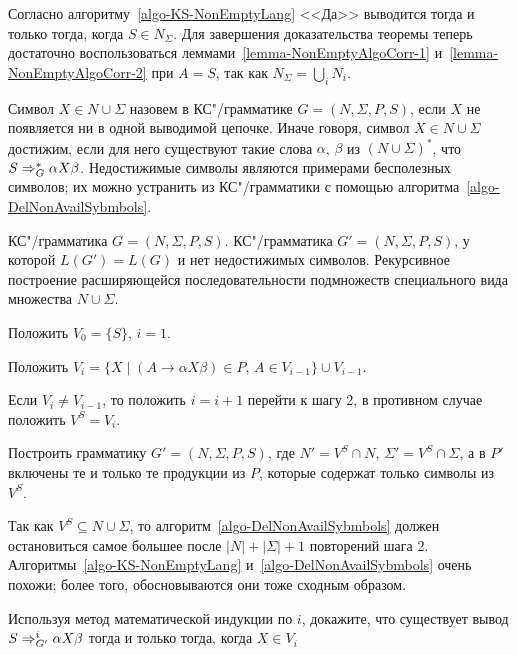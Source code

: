 \begin{myproof}
Согласно алгоритму~\ref{algo-KS-NonEmptyLang} <<Да>> выводится тогда и только тогда, когда $S\in N_\Sigma$. Для завершения доказательства теоремы теперь достаточно воспользоваться леммами~\ref{lemma-NonEmptyAlgoCorr-1} и~\ref{lemma-NonEmptyAlgoCorr-2} при $A=S$, так как $N_\Sigma=\bigcup_iN_i$.
\end{myproof}

Символ $X\in N\cup\Sigma$ назовем  в КС"/грамматике $G=(N,\Sigma,P,S)$, если $X$ не появляется ни в одной выводимой цепочке. Иначе говоря, символ $X\in N\cup\Sigma$ достижим, если для него существуют такие слова $\alpha$, $\beta$ из $(N\cup\Sigma)^*$, что $S\Rightarrow_G^*\alpha X\beta$. Недостижимые символы являются примерами бесполезных символов; их можно устранить из КС"/грамматики с помощью алгоритма~\ref{algo-DelNonAvailSybmbols}.

{\label{algo-DelNonAvailSybmbols}КС"/грамматика $G=(N,\Sigma,P,S)$.}
{КС"/грамматика $G'=(N,\Sigma,P,S)$, у которой $L(G')=L(G)$ и нет недостижимых символов.}
{Рекурсивное построение расширяющейся последовательности подмножеств специального вида множества $N\cup\Sigma$.}
{
\item Положить $V_0=\{S\}$, $i=1$.

\item  Положить $V_i=\{X\mid (A\to\alpha X\beta)\in P$, $A\in V_{i-1} \}\cup V_{i-1}$.

\item  Если $V_i\neq V_{i-1}$, то положить $i=i+1$ перейти к шагу 2, в противном случае положить $V^S=V_i$.

\item  Построить грамматику $G'=(N,\Sigma,P,S)$, где $N'=V^S\cap N$, $\Sigma '=V^S\cap\Sigma$, а в $P'$ включены те и только те продукции из $P$, которые содержат только символы из $V^S$.
}

Так как $V^S\subseteq N\cup\Sigma$, то алгоритм~\ref{algo-DelNonAvailSybmbols} должен остановиться самое большее после $|N| + |\Sigma|+1$ повторений шага 2. Алгоритмы~\ref{algo-KS-NonEmptyLang} и~\ref{algo-DelNonAvailSybmbols} очень похожи; более того, обосновываются они тоже сходным образом.

\begin{myproblem}
Используя метод математической индукции по $i$, докажите, что существует вывод $S\Rightarrow_{G'}^i\alpha X\beta$ тогда и только тогда, когда $X\in V_i$
\end{myproblem}

